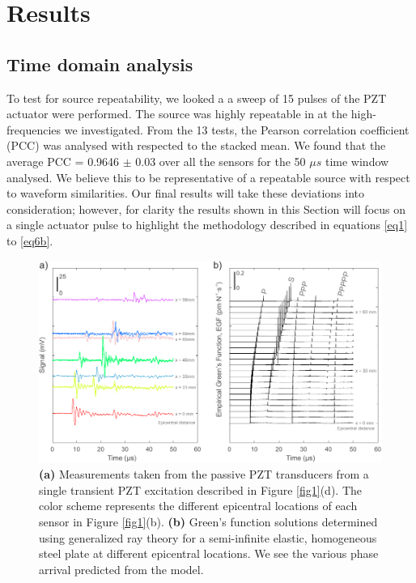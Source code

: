 \documentclass[preprint,3p, 11pt,authoryear]{elsarticle}
\begin{document}
{\section{Results}
\label{results}
\subsection{Time domain analysis}
To test for source repeatability, we looked a a sweep of 15 pulses of the PZT actuator were performed.  The source was highly repeatable in at the high-frequencies we investigated.  From the 13 tests, the Pearson correlation coefficient (PCC) was analysed with respected to the stacked mean. We found that the average PCC = 0.9646 $\pm$ 0.03 over all the sensors for the 50 $\mu s$ time window analysed. We believe this to be representative of a repeatable source with respect to waveform similarities. Our final results will take these deviations into consideration; however, for clarity the results shown in this Section will focus on a single actuator pulse to highlight the methodology described in equations \eqref{eq1} to \eqref{eq6b}.

\begin{figure}[ht]
     	\centering
\includegraphics[scale= 1.0]{FIG3.pdf} 
\caption{\textbf{(a)} Measurements taken from the passive PZT transducers from a single transient PZT excitation described in Figure \ref{fig1}(d). The color scheme represents the different epicentral locations of each sensor in Figure \ref{fig1}(b).  \textbf{(b)} Green's function solutions determined using generalized ray theory for a semi-infinite elastic, homogeneous steel plate at different epicentral locations.  We see the various phase arrival predicted from the model.}
	\label{fig3} 
\end{figure}

}
\end{document}

